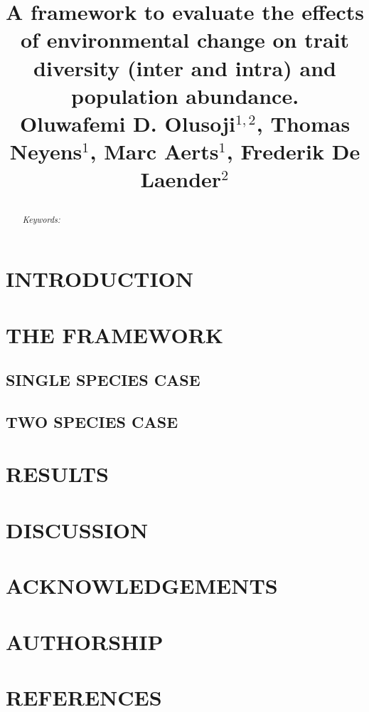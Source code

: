 \documentclass[a4paper,12pt]{article}
\title{
		\begin{flushleft} 
			\Huge{A framework to evaluate the effects of environmental change on trait diversity (inter and intra)
			and population abundance.} \\ 
		\vspace{0.4in} \small{Oluwafemi D. Olusoji$^{1,2}$, Thomas Neyens$^{1}$, Marc Aerts$^{1}$, Frederik De Laender$^{2}$}
		\end{flushleft}
	}
\date{}
\begin{document}
	\maketitle
	\newpage
	\begin{abstract}
			
		\noindent \textit{Keywords: }
	\end{abstract}
	
	
\section*{INTRODUCTION}

\section*{THE FRAMEWORK}

\subsection*{SINGLE SPECIES CASE}

\subsection*{TWO SPECIES CASE}

\section*{RESULTS}

\section*{DISCUSSION}

\section*{ACKNOWLEDGEMENTS}

\section*{AUTHORSHIP}

\section*{REFERENCES}
	
	
\end{document}
